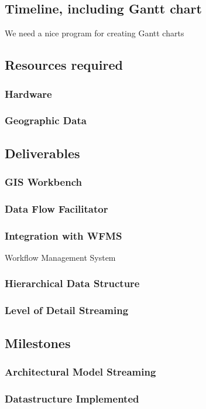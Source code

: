 \documentclass[12pt,a4paper]{article}
\begin{document}
\subsection{Timeline, including Gantt chart}
We need a nice program for creating Gantt charts
\subsection{Resources required}
\subsubsection*{Hardware}
\subsubsection*{Geographic Data}
\subsection{Deliverables}
\subsubsection{GIS Workbench}
\subsubsection{Data Flow Facilitator}
\subsubsection{Integration with WFMS}
Workflow Management System
\subsubsection{Hierarchical Data Structure}
\subsubsection{Level of Detail Streaming}
\subsection{Milestones}
\subsubsection{Architectural Model Streaming}
\subsubsection*{Datastructure Implemented}
\end{document}
